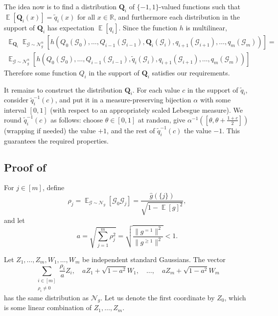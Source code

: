 \documentclass{article}
\theoremstyle{definition}
\theoremstyle{remark}
\DeclareMathOperator*{\E}{\mathbb{E}}
\providecommand{\cG}{\mathcal{G}}
\providecommand{\normal}{\mathcal{N}}
\providecommand{\normalg}[1]{\normal_{#1}}
\renewcommand\ge{\geqslant}
\begin{document}
The idea now is to find a distribution $\mathbf{Q}_i$ of $\{-1,1\}$-valued functions such that $\E[\mathbf{Q}_i(x)] = \tilde{q}_i(x)$ for all $x \in \mathbb{R}$, and furthermore each distribution in the support of $\mathbf{Q}_i$ has expectation $\E[q_i]$. Since the function $h$ is multilinear,
\begin{multline*}
 \E_{\mathbf{Q}_i}
 \E_{\mathcal{G} \sim \normalg{g}^n}[h(Q_0(\mathcal{G}_0),\ldots,Q_{i-1}(\mathcal{G}_{i-1}),\mathbf{Q}_i(\mathcal{G}_i),q_{i+1}(\mathcal{G}_{i+1}),\ldots,q_m(\mathcal{G}_m))] = \\
 \E_{\mathcal{G} \sim \normalg{g}^n}[h(Q_0(\mathcal{G}_0),\ldots,Q_{i-1}(\mathcal{G}_{i-1}),\tilde{q}_i(\mathcal{G}_i),q_{i+1}(\mathcal{G}_{i+1}),\ldots,q_m(\mathcal{G}_m))]
\end{multline*}
Therefore some function $Q_i$ in the support of $\mathbf{Q}_i$ satisfies our requirements.

It remains to construct the distribution $\mathbf{Q}_i$. For each value $c$ in the support of $\tilde{q}_i$, consider $\tilde{q}_i^{-1}(c)$, and put it in a measure-preserving bijection $\alpha$ with some interval $[0,1]$ (with respect to an appropriately scaled Lebesgue measure). We round $\tilde{q}_i^{-1}(c)$ as follows: choose $\theta \in [0,1]$ at random, give $\alpha^{-1}([\theta,\theta+\frac{1+c}{2}])$ (wrapping if needed) the value $+1$, and the rest of $\tilde{q}_i^{-1}(c)$ the value $-1$. This guarantees the required properties.

\subsection{Proof of }

For $j \in [m]$, define
\[
 \rho_j = \E_{\cG \sim \normalg{g}}[\cG_0 \cG_j] = \frac{\hat{g}(\{j\})}{\sqrt{1 - \E[g]^2}},
\]
and let
\[
 a = \sqrt{\sum_{j=1}^m \rho_j^2} = \sqrt{\frac{\|g^{=1}\|^2}{\|g^{\ge 1}\|^2}} < 1.
\]

Let $Z_1,\ldots,Z_m,W_1,\ldots,W_m$ be independent standard Gaussians. The vector
\[
 \sum_{\substack{i \in [m] \\ \rho_i \neq 0}} \frac{\rho_i}{a} Z_i, \quad a Z_1 + \sqrt{1-a^2} W_1, \quad \ldots, \quad a Z_m + \sqrt{1-a^2} W_m
\]
has the same distribution as $\normalg{g}$. Let us denote the first coordinate by $Z_0$, which is some linear combination of $Z_1,\ldots,Z_m$.
\end{document}
